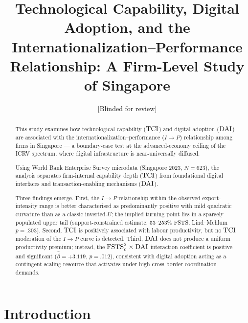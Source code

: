 \documentclass[smallextended]{svjour3}   %
\begin{document}
\title{Technological Capability, Digital Adoption, and the
  Internationalization--Performance Relationship: A Firm-Level Study of
  Singapore}

\author{[Blinded for review]}

\maketitle

\begin{abstract}
This study examines how technological capability (\({\mathrm{TCI}}\)) and digital
adoption (\({\mathrm{DAI}}\)) are associated with the internationalization--performance
(\(I \to P\)) relationship among firms in Singapore --- a boundary-case test
at the advanced-economy ceiling of the ICRV spectrum, where digital
infrastructure is near-universally diffused.

Using World Bank Enterprise Survey microdata (Singapore 2023, \(N = 623\)),
the analysis separates firm-internal capability depth (\({\mathrm{TCI}}\)) from
foundational digital interfaces and transaction-enabling mechanisms (\({\mathrm{DAI}}\)).

Three findings emerge.  First, the \(I \to P\) relationship within the
observed export-intensity range is better characterised as predominantly
positive with mild quadratic curvature than as a classic inverted-\(U\); the
implied turning point lies in a sparsely populated upper tail (support-constrained
estimate: 53--253\% FSTS, Lind--Mehlum \(p = .303\)).  Second, \({\mathrm{TCI}}\) is
positively associated with labour productivity, but no \({\mathrm{TCI}}\) moderation of
the \(I \to P\) curve is detected.  Third, \({\mathrm{DAI}}\) does not produce a uniform
productivity premium; instead, the \({\mathrm{FSTS}_{c}^{2}} \times {\mathrm{DAI}}\) interaction
coefficient is positive and significant (\(\hat{\beta} = +3.119\),
\(p = .012\)), consistent with digital adoption acting as a contingent scaling
resource that activates under high cross-border coordination demands.

\end{abstract}

\section{Introduction}
\label{sec:intro}
\end{document}
